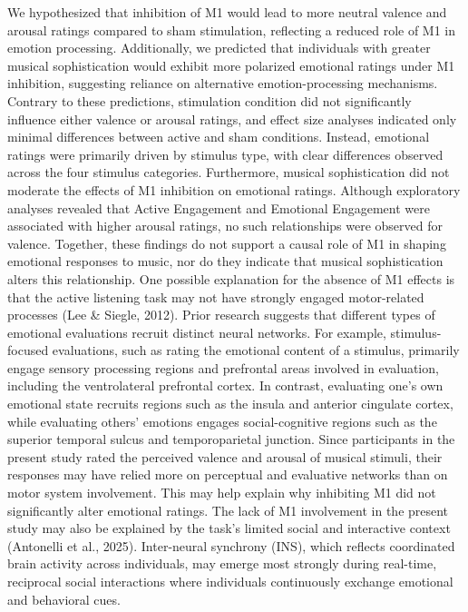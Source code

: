 \documentclass[
]{article}
\begin{document}
We hypothesized that inhibition of M1 would lead to more neutral valence
and arousal ratings compared to sham stimulation, reflecting a reduced
role of M1 in emotion processing. Additionally, we predicted that
individuals with greater musical sophistication would exhibit more
polarized emotional ratings under M1 inhibition, suggesting reliance on
alternative emotion-processing mechanisms. Contrary to these
predictions, stimulation condition did not significantly influence
either valence or arousal ratings, and effect size analyses indicated
only minimal differences between active and sham conditions. Instead,
emotional ratings were primarily driven by stimulus type, with clear
differences observed across the four stimulus categories. Furthermore,
musical sophistication did not moderate the effects of M1 inhibition on
emotional ratings. Although exploratory analyses revealed that Active
Engagement and Emotional Engagement were associated with higher arousal
ratings, no such relationships were observed for valence. Together,
these findings do not support a causal role of M1 in shaping emotional
responses to music, nor do they indicate that musical sophistication
alters this relationship. One possible explanation for the absence of M1
effects is that the active listening task may not have strongly engaged
motor-related processes (Lee \& Siegle, 2012). Prior research suggests
that different types of emotional evaluations recruit distinct neural
networks. For example, stimulus-focused evaluations, such as rating the
emotional content of a stimulus, primarily engage sensory processing
regions and prefrontal areas involved in evaluation, including the
ventrolateral prefrontal cortex. In contrast, evaluating one's own
emotional state recruits regions such as the insula and anterior
cingulate cortex, while evaluating others' emotions engages
social-cognitive regions such as the superior temporal sulcus and
temporoparietal junction. Since participants in the present study rated
the perceived valence and arousal of musical stimuli, their responses
may have relied more on perceptual and evaluative networks than on motor
system involvement. This may help explain why inhibiting M1 did not
significantly alter emotional ratings. The lack of M1 involvement in the
present study may also be explained by the task's limited social and
interactive context (Antonelli et al., 2025). Inter-neural synchrony
(INS), which reflects coordinated brain activity across individuals, may
emerge most strongly during real-time, reciprocal social interactions
where individuals continuously exchange emotional and behavioral cues.
\end{document}
